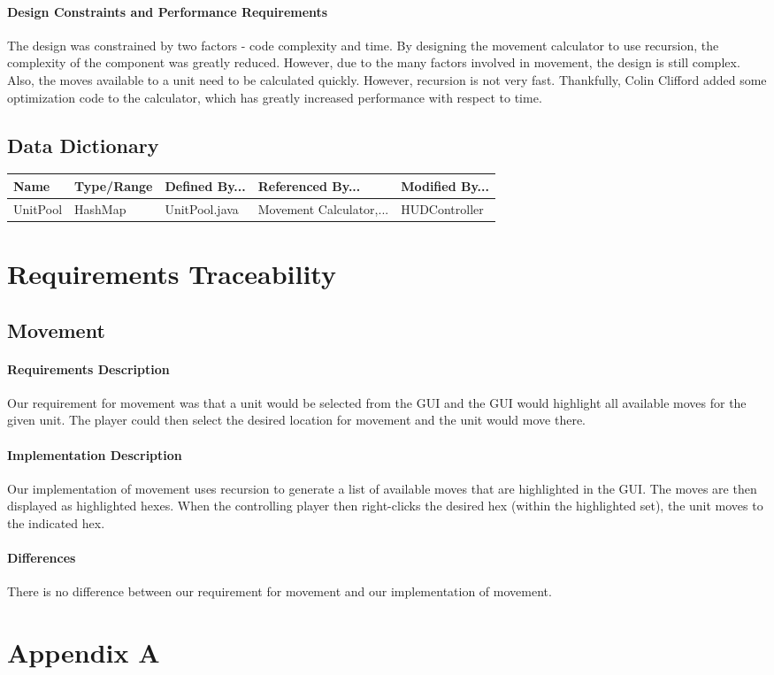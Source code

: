 \documentclass[12pt,a4paper]{article}
\begin{document}
			\paragraph{Design Constraints and Performance Requirements} The design was constrained by two factors - code complexity and time. By designing the movement calculator to use recursion, the complexity of the component was greatly reduced. However, due to the many factors involved in movement, the design is still complex. Also, the moves available to a unit need to be calculated quickly. However, recursion is not very fast. Thankfully, Colin Clifford added some optimization code to the calculator, which has greatly increased performance with respect to time.
	\subsection{Data Dictionary}
\small{
\begin{center}
\noindent\begin{tabularx}{\linewidth}{|X|X|X|X|X|}\hline
\textbf{Name} & \textbf{Type/Range} & \textbf{Defined By...} & \textbf{Referenced By...} & \textbf{Modified By...}\\
\hline
UnitPool & HashMap & UnitPool.java & Movement Calculator,... & HUDController\\
\hline
\end{tabularx}
\end{center}
}
\section{Requirements Traceability}
	\subsection{Movement}
		\paragraph{Requirements Description} Our requirement for movement was that a unit would be selected from the GUI and the GUI would highlight all available moves for the given unit. The player could then select the desired location for movement and the unit would move there.
		\paragraph{Implementation Description} Our implementation of movement uses recursion to generate a list of available moves that are highlighted in the GUI. The moves are then displayed as highlighted hexes. When the controlling player then right-clicks the desired hex (within the highlighted set), the unit moves to the indicated hex. 
		\paragraph{Differences} There is no difference between our requirement for movement and our implementation of movement.
\section{Appendix A}
\end{document}
